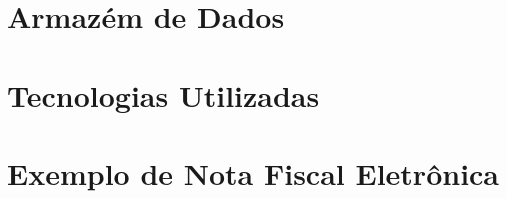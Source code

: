 \documentclass[mestrado, pre-defesa]{packages/icmc}
\begin{document}


\glsaddall
\printglossaries


\begin{apendicesenv}

    \chapter{Armazém de Dados}
    \label{chapter:armazem-de-dados}
    
    
    \chapter{Tecnologias Utilizadas}
    \label{chapter:tecnologias-utilizadas}
    
    
    \chapter{Exemplo de Nota Fiscal Eletrônica}
    \label{chapter:nfe}
    

\end{apendicesenv}
\end{document}
